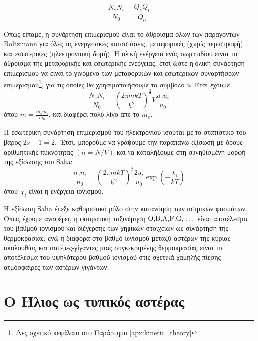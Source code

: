 \begin{equation}
    \label{eq:saha_partition_functions}
    \frac{N_e N_i}{N_0} = \frac{Q_e Q_i}{Q_0}
\end{equation}

Όπως είπαμε, η συνάρτηση επιμερισμού είναι το άθροισμα όλων των παραγόντων Boltzmann για όλες τις ενεργειακές καταστάσεις, μεταφορικές (χωρίς περιστροφή) και εσωτερικές (ηλεκτρονιακή δομή). Η ολική ενέργεια ενός σωματιδίου είναι το άθροισμα της μεταφορικής και εσωτερικής ενέργειας, έτσι ώστε η ολική συνάρτηση επιμερισμού να είναι το γινόμενο των μεταφορικών και εσωτερικών συναρτήσεων επιμερισμού\footnote{Δες σχετικό κεφάλαιο στο Παράρτημα \ref{apx:kinetic_theory}}, για τις οποίες θα χρησιμοποιήσουμε το σύμβολο $u$. Έτσι έχουμε:
\begin{equation}
    \frac{N_e N_i}{N_0} = \left( \frac{2\pi m k T}{h^2} \right)^{\frac{3}{2}} V \frac{u_e u_i}{u_0}
\end{equation}
όπου $m = \frac{m_e m_i}{m_0}$, και διαφέρει πολύ λίγο από το $m_e$.

Η εσωτερική συνάρτηση επιμερισμού του ηλεκτρονίου ισούται με το στατιστικό του βάρος $2s + 1 = 2$. 'Ετσι, μπορούμε να γράψουμε την παραπάνω εξίσωση με όρους αριθμητικής πυκνότητας $(n = N/V)$ και να καταλήξουμε στη συνηθισμένη μορφή της εξίσωσης του Saha:
\begin{equation}
    \label{eq:saha_equation_full}
    \frac{n_e n_i}{n_0} = \left( \frac{2\pi m k T}{h^2} \right)^{\frac{3}{2}} \frac{2u_i}{u_0} \exp \left( - \frac{\chi_i}{kT} \right)
\end{equation}
όπου $\chi_i$ είναι η ενέργεια ιονισμού.

Η εξίσωση Saha έπεξε καθοριστικό ρόλο στην κατανόηση των αστρικών φασμάτων. Όπως έχουμε αναφέρει, η φασματική ταξινόμηση $\text{O,B,A,F,G, \dots}$ είναι αποτέλεσμα του βαθμού ιονισμού και διέγερσης των χημικών στοιχείων ως συνάρτηση της θερμοκρασίας, ενώ η διαφορά στο βαθμό ιονισμού μεταξύ αστέρων της κύριας ακολουθίας και αστέρες-γίγαντες μιας συγκεκριμένης θερμοκρασίας είναι το αποτέλεσμα του υψηλότερου βαθμού ιονισμού στις σχετικά χαμηλής πίεσης ατμόσφαιρες των αστέρων-γιγάντων.



\section{Ο Ήλιος ως τυπικός αστέρας}

